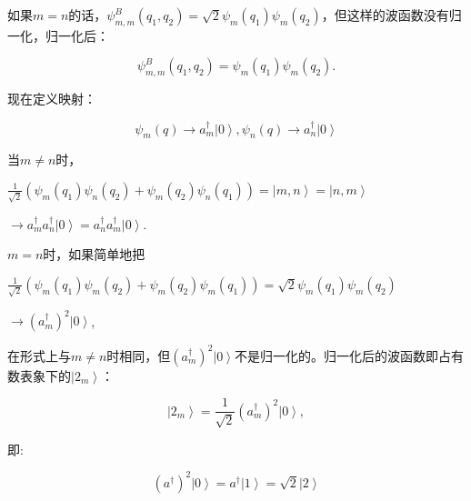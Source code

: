 如果$m=n$的话，$\psi_{m,m}^B(q_1,q_2) = \sqrt 2
\psi_m(q_1)\psi_m(q_2)$，但这样的波函数没有归一化，归一化后：

\begin{equation*}
\psi_{m,m}^B(q_1,q_2) = \psi_m(q_1) \psi_m(q_2) .
\end{equation*}

现在定义映射：

\begin{equation*}
\psi_m(q) \to a_m^{\dagger} \left| 0 \right\rangle, \psi_n(q) \to
a_n^{\dagger} \left| 0 \right\rangle
\end{equation*}


当$m \ne n$时，

\begin{center}

$\frac{1}{{\sqrt 2 }}\left( {\psi _m (q_1 )\psi _n (q_2 ) + \psi _m
(q_2 )\psi _n (q_1 )} \right) = \left| {m,n} \right\rangle  = \left|
{n,m} \right\rangle $

$\to a_m^\dag  a_n^\dag  \left| 0 \right\rangle = a_n^\dag  a_m^\dag
\left| 0 \right\rangle $.

\end{center}

$m=n$时，如果简单地把

\begin{center}

$\frac{1}{{\sqrt 2 }}\left( {\psi _m (q_1 )\psi _m (q_2 ) + \psi _m
(q_2 )\psi _m (q_1 )} \right) = \sqrt 2 \psi _m (q_1 )\psi _m (q_2
)$

$\to \left( {a_m^\dag  } \right)^2 \left| 0 \right\rangle$,

\end{center}

在形式上与$m \ne n$时相同，但$\left( {a_m^\dag  } \right)^2 \left| 0
\right\rangle$不是归一化的。归一化后的波函数即占有数表象下的$\left|
{2_m } \right\rangle$：

\begin{equation}\label{two bosons}
\left| {2_m } \right\rangle  = \frac{1}{{\sqrt 2 }}\left( {a_m^\dag
} \right)^2 \left| 0 \right\rangle ,
\end{equation}


即:

\begin{equation*}
\left( {a^\dag  } \right)^2 \left| 0 \right\rangle  = a^\dag \left|
1 \right\rangle  = \sqrt 2 \left| 2 \right\rangle
\end{equation*}


